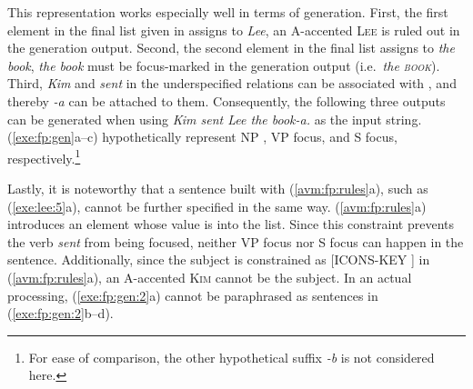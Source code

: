 



This representation works especially well in terms of generation.
First, the first element in the final  list given in
 assigns  to \textit{Lee}, an
A-accented \textsc{Lee} is ruled out in the generation output.
Second, the second element in the final  list assigns
 to \textit{the book}, \textit{the book} must be
focus-marked in the generation output (i.e.\ \textit{the
  \textsc{book}}). Third, \textit{Kim} and \textit{sent} in the
underspecified relations can be associated with ,
and thereby \textit{-a} can be attached to them.  Consequently, the following
three outputs can be generated when using \textit{Kim sent Lee the
  book-a.}  as the input string.  (\ref{exe:fp:gen}a--c) hypothetically
represent NP , VP focus, and S focus, respectively.\footnote{For
  ease of comparison, the other hypothetical suffix \textit{-b} is not
  considered here.}



Lastly, it is noteworthy that a sentence built with
(\ref{avm:fp:rules}a), such as (\ref{exe:lee:5}a), cannot be further
specified in the same way.  (\ref{avm:fp:rules}a) introduces an
element whose value is  into the 
list. Since this constraint prevents the verb \textit{sent} from being
focused, neither VP focus nor S focus can happen in the
sentence. Additionally, since the subject is constrained as [ICONS-KEY
  ] in (\ref{avm:fp:rules}a), an
A-accented \textsc{Kim} cannot be the subject.  In an actual
processing, (\ref{exe:fp:gen:2}a) cannot be paraphrased as sentences
in (\ref{exe:fp:gen:2}b--d).

